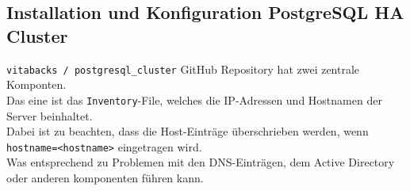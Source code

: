 
\begin{flushleft}
    \subsection{Installation und Konfiguration PostgreSQL HA Cluster}
    \texttt{vitabacks / postgresql\_cluster} \Gls{GitHub} Repository hat zwei zentrale Komponten.\\
    Das eine ist das \texttt{Inventory}-File, welches die IP-Adressen und Hostnamen der Server beinhaltet.\\
    Dabei ist zu beachten, dass die Host-Einträge überschrieben werden, wenn \texttt{hostname=<hostname>} eingetragen wird.\\
    Was entsprechend zu Problemen mit den DNS-Einträgen, dem Active Directory oder anderen komponenten führen kann.
\end{flushleft}
